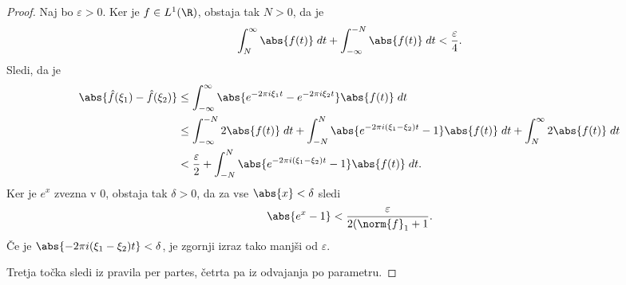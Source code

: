 \begin{proof}
Naj bo $\varepsilon > 0$. Ker je $f \in L^1(\R)$, obstaja tak
$N > 0$, da je
\[
\int_N^\infty \abs{f(t)}\;dt + \int_{-\infty}^{-N} \abs{f(t)}\;dt
< \frac{\varepsilon}{4}.
\]
Sledi, da je
\begin{align*}
\abs{\hat{f}(\xi_1) - \hat{f}(\xi_2)} &\leq
\int_{-\infty}^\infty
\abs{e^{-2\pi i \xi_1 t} - e^{-2\pi i \xi_2 t}} \abs{f(t)}\;dt
\\
&\leq
\int_{-\infty}^{-N} 2 \abs{f(t)}\;dt +
\int_{-N}^N \abs{e^{-2\pi i (\xi_1-\xi_2) t} - 1} \abs{f(t)}\;dt +
\int_N^\infty 2 \abs{f(t)}\;dt
\\
&<
\frac{\varepsilon}{2} +
\int_{-N}^N \abs{e^{-2\pi i (\xi_1-\xi_2) t} - 1} \abs{f(t)}\;dt.
\end{align*}
Ker je $e^x$ zvezna v $0$, obstaja tak $\delta > 0$, da za vse
$\abs{x} < \delta$ sledi
\[
\abs{e^x - 1} < \frac{\varepsilon}{2 (\norm{f}_1 + 1}.
\]
Če je $\abs{-2\pi i (\xi_1-\xi_2) t} < \delta$, je zgornji izraz
tako manjši od $\varepsilon$.

Tretja točka sledi iz pravila per partes, četrta pa iz odvajanja po
parametru.


\end{proof}
